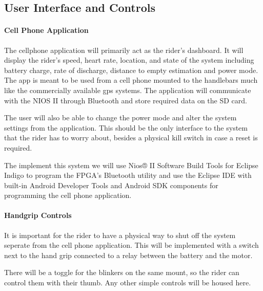 \documentclass[12pt,article]{IEEEtran}
\begin{document}
    \subsection{\bfseries User Interface and Controls}
        \paragraph{\bfseries Cell Phone Application}
            The cellphone application will primarily act as the rider’s dashboard. It will display the 
            rider’s speed, heart rate, location, and state of the system including battery charge, rate 
            of discharge, distance to empty estimation and power mode. The app is meant to be used from 
            a cell phone mounted to the handlebars much like the commercially available gps systems. The
            application will communicate with the NIOS II through Bluetooth and store required data on the 
            SD card. 
            
            The user will also be able to change the power mode and alter the system settings from the
            application. This should be the only interface to the system that the rider has to worry about,
            besides a physical kill switch in case a reset is required.
            
            The implement this system we will use Nios® II Software Build Tools for Eclipse Indigo to program 
            the FPGA’s Bluetooth utility and use the Eclipse IDE with built-in Android Developer Tools and Android 
            SDK components for programming the cell phone application.
            
        \paragraph{\bfseries Handgrip Controls}
            It is important for the rider to have a physical way to shut off the system seperate from the cell 
            phone application. This will be implemented with a switch next to the hand grip connected to a relay 
            between the battery and the motor. 
            
            There will be a toggle for the blinkers on the same mount, so the rider can control them with their
            thumb. Any other simple controls will be housed here. 
            
\end{document}
